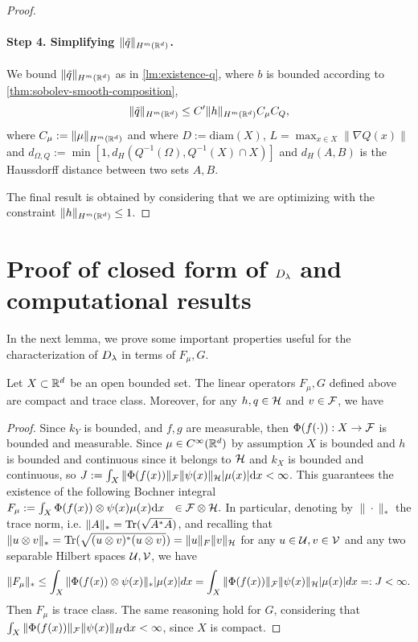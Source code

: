 \begin{proof}
\paragraph{Step 4. Simplifying $\|\tilde{q}\|_{H^m(\mathbb R^d)}$.}
We bound $\|\tilde{q}\|_{H^m(\mathbb R^d)}$ as in \cref{lm:existence-q}, where $b$ is bounded according to \cref{thm:sobolev-smooth-composition},
$$\|\tilde{q}\|_{H^m(\mathbb R^d)} \leq C^\prime\|h\|_{H^m(\mathbb R^d)} C_\mu C_Q,$$
where $C_\mu := \|\mu\|_{H^m(\mathbb R^d)}$ and
where $D := \textrm{diam}(X)$,  $L = \max_{x \in X} \|\nabla Q (x)\|$ and $d_{\Omega, Q} := \min[1, d_H(Q^{-1}(\Omega), Q^{-1}(X) \cap X)]$ and $d_H(A, B)$ is the Haussdorff distance between two sets $A, B$.

The final result is obtained by considering that we are optimizing with the constraint $\|h\|_{H^m(\mathbb R^d)} \leq 1$.
\end{proof}


\section{Proof of closed form of $D_\lambda$ and computational results}\label{sec:additional-proofs}

In the next lemma, we prove some important properties useful for the characterization of $D_\lambda$ in terms of $F_\mu, G$.


\begin{lemma}\label{lm:explicit-Fmu-G}
Let $X \subset \mathbb R^d$ be an open bounded set. The linear operators $F_\mu, G$ defined above are compact and trace class.
Moreover, for any $h, q \in \mathcal H$ and $v \in {\cal F}$, we have
\end{lemma}
\begin{proof}
Since $k_Y$ is bounded, and $f, g$ are measurable, then $\Phi(f(\cdot)):X \to {\cal F}$ is bounded and measurable. Since $\mu \in C^\infty(\mathbb R^d)$ by assumption $X$ is bounded and $h$ is bounded and continuous since it belongs to $\mathcal H$ and $k_X$ is bounded and continuous, so $J := \int_X \|\Phi(f(x))\|_{\cal F} \|\psi(x)\|_{\mathcal H}|\mu(x)| \mathrm{d} x < \infty$. This guarantees the existence of the following Bochner integral
$F_\mu:=\int_X \Phi(f(x)) \otimes \psi(x) \mu(x)\mathrm{d} x ~~ \in {\cal F} \otimes {\mathcal H}.$
In particular, denoting by $\|\cdot\|_*$ the trace norm, i.e. $\|A\|_* = \operatorname{Tr}(\sqrt{A^*A})$, and recalling that
$\|u \otimes v\|_* = \operatorname{Tr}(\sqrt{(u \otimes v)^*(u \otimes v)}) = \|u\|_{F}\|v\|_{\mathcal H}$ for any $u \in {\cal U}, v \in {\cal V}$ and any two separable Hilbert spaces ${\cal U}, {\cal V}$, we have
$$\|F_\mu\|_* \leq \int_X \|\Phi(f(x)) \otimes \psi(x)\|_* |\mu(x)| dx = \int_X \|\Phi(f(x))\|_{\cal F} \|\psi(x)\|_\mathcal H |\mu(x)| dx =: J < \infty.$$
Then $F_\mu$ is trace class.
The same reasoning hold for $G$, considering that $\int_X \|\Phi(f(x))\|_{\cal F} \|\psi(x)\|_{H} \mathrm{d} x < \infty$, since $X$ is compact.
\end{proof}

